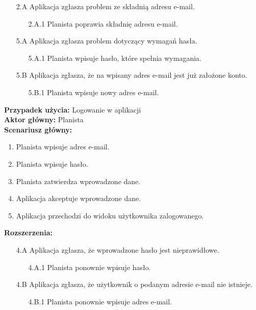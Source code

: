 	\begin{enumerate}
         \item[2.A] Aplikacja zgłasza problem ze składnią adresu e-mail.
         \begin{enumerate}
         	\item[2.A.1] Planista poprawia składnię adresu e-mail.
         \end{enumerate}
         \item[5.A] Aplikacja zgłasza problem  dotyczący wymagań hasła.
         \begin{enumerate}
         	\item[5.A.1] Planista wpisuje hasło, które spełnia wymagania.
         \end{enumerate}
         \item[5.B] Aplikacja zgłasza, że na wpisany adres e-mail jest już założone konto.
         \begin{enumerate}
         	\item[5.B.1] Planista wpisuje nowy adres e-mail.
         \end{enumerate}
	\end{enumerate}
	
\noindent
\textbf{Przypadek użycia:} Logowanie w aplikacji\\
\textbf{Aktor główny:} Planista\\
\textbf{Scenariusz główny:}
\begin{enumerate}
	\item Planista wpisuje adres e-mail.
	\item Planista wpisuje hasło.
	\item Planista zatwierdza wprowadzone dane.
	\item Aplikacja akceptuje wprowadzone dane.
	\item Aplikacja przechodzi do widoku użytkownika zalogowanego.
\end{enumerate}
\textbf{Rozszerzenia:}
	\begin{enumerate}
         \item[4.A] Aplikacja zgłasza, że wprowadzone hasło jest nieprawidłowe.
         \begin{enumerate}
         	\item[4.A.1] Planista ponownie wpisuje hasło.
         \end{enumerate}
         \item[4.B] Aplikacja zgłasza, że użytkownik o podanym adresie e-mail nie istnieje.
         \begin{enumerate}
         	\item[4.B.1] Planista ponownie wpisuje adres e-mail.
         \end{enumerate}
	\end{enumerate}
	

